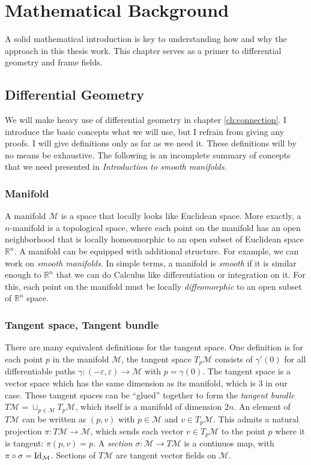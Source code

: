 \documentclass[../thesis.tex]{subfiles}
\begin{document}
\chapter{Mathematical Background}\label{ch:math-background}

A solid mathematical introduction is key to understanding how and why the approach
in this thesis work. This chapter serves as a primer to differential geometry and frame fields.
\section{Differential Geometry}
We will make heavy use of differential geometry in chapter \autoref{ch:connection}.
I introduce the basic concepts what we will use, but I refrain from
giving any proofs. I will give definitions only as far as we need it. These definitions
will by no means be exhaustive. The following is an incomplete summary of concepts that we need presented in
\emph{Introduction to smooth manifolds}\cite{Lee00}.

\subsection{Manifold} A manifold $\mathcal{M}$ is a space that locally looks like Euclidean space.
More exactly, a $n$-manifold is a topological space, where each point on the manifold has an open neighborhood
that is locally homeomorphic to an open subset of Euclidean space $\mathbb{R}^n$.
A manifold can be equipped with additional structure. For example, we can work on \emph{smooth manifolds}.
In simple terms, a manifold is \emph{smooth} if it is similar enough to $\mathbb{R}^n$ that we can do Calculus
like differentiation or integration on it. For this, each point on the manifold must be
locally \emph{diffeomorphic} to an open subset of $\mathbb{R}^n$ space.

\subsection{Tangent space, Tangent bundle} There are many equivalent definitions
for the tangent space. One definition is for each point $p$ in the manifold $\mathcal{M}$,
the tangent space $T_p\mathcal{M}$ consists of $\gamma'(0)$ for all differentiable paths $\gamma: (-\varepsilon, \varepsilon) \to \mathcal{M}$
with $p = \gamma(0)$. The tangent space is a vector space which has the same dimension as its manifold,
which is 3 in our case. These tangent spaces can be ``glued'' together to form the
\emph{tangent bundle} $T\mathcal{M} = \sqcup _{p \in \mathcal{M}}T_p\mathcal{M}$, which itself
is a manifold of dimension $2n$. An element of $T\mathcal{M}$ can be written
as $(p,v)$ with $p \in \mathcal{M}$ and $v \in T_p\mathcal{M}$. This admits a natural projection $\pi : T\mathcal{M} \to \mathcal{M}$,
which sends each vector $v \in T_p\mathcal{M}$ to the point $p$ where it is tangent: $\pi(p,v)=p$.
A \emph{section} $\sigma: \mathcal{M} \to T\mathcal{M}$ is a continuos map, with $\pi \circ \sigma = \operatorname{Id}_{\mathcal{M}}$.
Sections of $T\mathcal{M}$ are tangent vector fields on $\mathcal{M}$.
\end{document}

